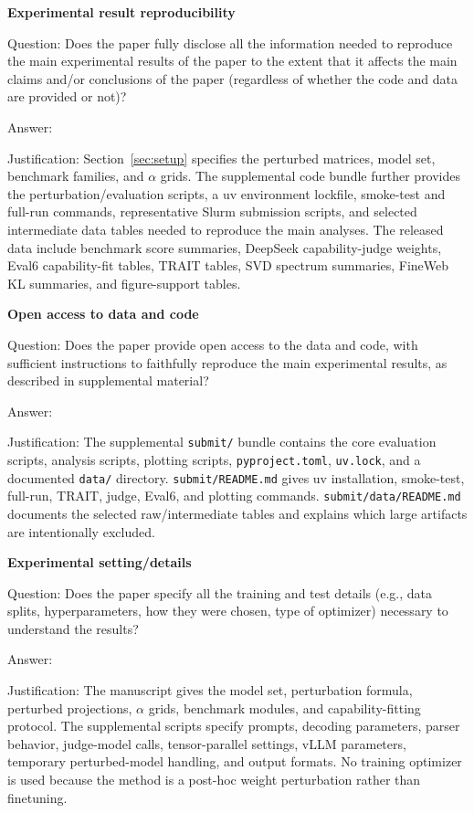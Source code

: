 
\item {\bf Experimental result reproducibility}
    \item[] Question: Does the paper fully disclose all the information needed to reproduce the main experimental results of the paper to the extent that it affects the main claims and/or conclusions of the paper (regardless of whether the code and data are provided or not)?
    \item[] Answer: \answerYes{}
    \item[] Justification: Section~\ref{sec:setup} specifies the perturbed matrices, model set, benchmark families, and $\alpha$ grids. The supplemental code bundle further provides the perturbation/evaluation scripts, a uv environment lockfile, smoke-test and full-run commands, representative Slurm submission scripts, and selected intermediate data tables needed to reproduce the main analyses. The released data include benchmark score summaries, DeepSeek capability-judge weights, Eval6 capability-fit tables, TRAIT tables, SVD spectrum summaries, FineWeb KL summaries, and figure-support tables.

\item {\bf Open access to data and code}
    \item[] Question: Does the paper provide open access to the data and code, with sufficient instructions to faithfully reproduce the main experimental results, as described in supplemental material?
    \item[] Answer: \answerYes{}
    \item[] Justification: The supplemental \texttt{submit/} bundle contains the core evaluation scripts, analysis scripts, plotting scripts, \texttt{pyproject.toml}, \texttt{uv.lock}, and a documented \texttt{data/} directory. \texttt{submit/README.md} gives uv installation, smoke-test, full-run, TRAIT, judge, Eval6, and plotting commands. \texttt{submit/data/README.md} documents the selected raw/intermediate tables and explains which large artifacts are intentionally excluded.

\item {\bf Experimental setting/details}
    \item[] Question: Does the paper specify all the training and test details (e.g., data splits, hyperparameters, how they were chosen, type of optimizer) necessary to understand the results?
    \item[] Answer: \answerYes{}
    \item[] Justification: The manuscript gives the model set, perturbation formula, perturbed projections, $\alpha$ grids, benchmark modules, and capability-fitting protocol. The supplemental scripts specify prompts, decoding parameters, parser behavior, judge-model calls, tensor-parallel settings, vLLM parameters, temporary perturbed-model handling, and output formats. No training optimizer is used because the method is a post-hoc weight perturbation rather than finetuning.

